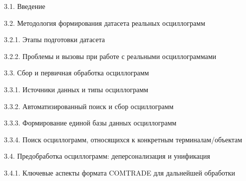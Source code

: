 \noindent\hspace*{1.5em}3.1. Введение\par\vspace{0.5mm}
\noindent\hspace*{1.5em}3.2. Методология формирования датасета реальных осциллограмм\par\vspace{0.5mm}
\noindent\hspace*{3.0em}3.2.1. Этапы подготовки датасета\par\vspace{0.5mm}
\noindent\hspace*{3.0em}3.2.2. Проблемы и вызовы при работе с реальными осциллограммами\par\vspace{0.5mm}
\noindent\hspace*{1.5em}3.3. Сбор и первичная обработка осциллограмм\par\vspace{0.5mm}
\noindent\hspace*{3.0em}3.3.1. Источники данных и типы осциллограмм\par\vspace{0.5mm}
\noindent\hspace*{3.0em}3.3.2. Автоматизированный поиск и сбор осциллограмм\par\vspace{0.5mm}
\noindent\hspace*{3.0em}3.3.3. Формирование единой базы данных осциллограмм\par\vspace{0.5mm}
\noindent\hspace*{3.0em}3.3.4. Поиск осциллограмм, относящихся к конкретным терминалам/объектам\par\vspace{0.5mm}
\noindent\hspace*{1.5em}3.4. Предобработка осциллограмм: деперсонализация и унификация\par\vspace{0.5mm}
\noindent\hspace*{3.0em}3.4.1. Ключевые аспекты формата COMTRADE для дальнейшей обработки\par\vspace{0.5mm}
